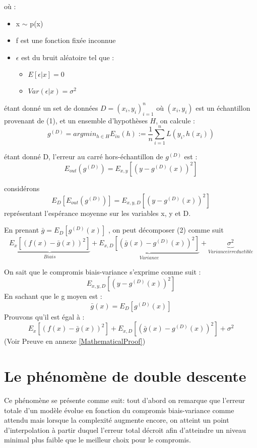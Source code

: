 \documentclass[a4paper]{article}
\begin{document}
où : 

\begin{itemize}
	\item x $\sim$ p(x)
	\item f est une fonction fixée inconnue
	\item $\epsilon$ est du bruit aléatoire tel que :
	\begin{itemize}
		\item $E[\epsilon|x] = 0$
		\item $Var(\epsilon|x) = \sigma^2$
	\end{itemize}
\end{itemize}


étant donné un set de données $D = {(x_i, y_i)}^n_{i=1}$ où $(x_i, y_i)$ est un échantillon provenant de (1), et un ensemble d'hypothèses $H$, on calcule : \newline
\[ g^{(D)} = argmin_{h\in H}  E_{in}(h) := \frac{1}{n} \sum_{i=1}^{n} L(y_i,h(x_i)) \]

étant donné D, l'erreur au carré hors-échantillon de $g^{(D)}$ est : \newline
\[ E_{out}(g^{(D)}) = E_{x,y}[(y - g^{(D)}(x))^2] \]

considérons 
\begin{equation}
E_D[E_{out}(g^{(D)})] = E_{x,y,D}[(y - g^{(D)}(x))^2]
\end{equation}
représentant l'espérance moyenne sur les variables x, y et D. \newline

En prenant $ \bar{g} = E_D[g^{(D)}(x)]$ , on peut décomposer (2) comme suit 
\[ \underbrace{E_x[(f(x) - \bar{g}(x))^2]}_{Biais} + \underbrace{E_{x,D}[(\bar{g}(x) - g^{(D)}(x))^2]}_{Variance} + \underbrace{\sigma^2}_{Variance irreductible} \]

\newpage

On sait que le compromis biais-variance s'exprime comme suit : 
\[ E_{x,y,D}[(y-g^{(D)}(x))^2] \]
En sachant que le g moyen est :
\begin{equation}
\label{g_moyen}
\bar{g}(x) = E_D [g^{(D)}(x)]
\end{equation}
Prouvons qu'il est égal à :
\[ E_x[(f(x) - \bar{g}(x))^2] + E_{x,D}[(\bar{g}(x) - g^{(D)}(x))^2] + \sigma^2 \]
(Voir Preuve en annexe \ref{MathematicalProof})

\newpage

\section{Le phénomène de double descente}
Ce phénomène se présente comme suit: tout d'abord on remarque que l'erreur totale d'un modèle évolue en fonction du compromis biais-variance comme attendu mais lorsque la complexité augmente encore, on atteint un point d'interpolation à partir duquel l'erreur total décroit afin d'atteindre un niveau minimal plus faible que le meilleur choix pour le compromis.
\end{document}
